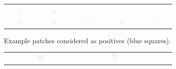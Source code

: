 \begin{figure}
\begin{subfigure}{\textwidth}
\begin{tabular}{c@{\,}c@{\,}c@{\,}c@{\,}c@{}}
			\includegraphics[width=0.1\textwidth]{fig01b09} &
			\includegraphics[width=0.1\textwidth]{fig01b10} \\
			\includegraphics[width=0.1\textwidth]{fig01b11} &
			\includegraphics[width=0.1\textwidth]{fig01b12} &
			\includegraphics[width=0.1\textwidth]{fig01b13} &
			\includegraphics[width=0.1\textwidth]{fig01b14} &
			\includegraphics[width=0.1\textwidth]{fig01b15}
		\end{tabular}
		\vspace{-0.5em}
		\caption{Example patches considered as positives (blue squares).}
		\vspace{1em}
	\end{subfigure}
	\begin{subfigure}{\textwidth}
		\centering
		\begin{tabular}{c@{\,}c@{\,}c@{\,}c@{\,}c@{}}
			\includegraphics[width=0.1\textwidth]{fig01c01} &
			\includegraphics[width=0.1\textwidth]{fig01c02} &

\end{tabular}
\end{subfigure}
\end{figure}
